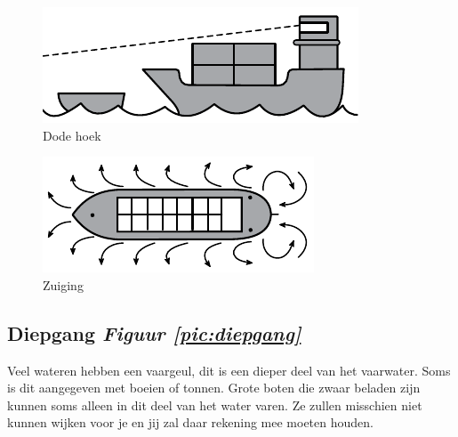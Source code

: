   \begin{center}
  \begin{minipage}[b]{0.32\textwidth}
    \begin{figure}[H]
 		\includegraphics[width=\textwidth]{Hoofdstukken/Veiligheid/pdf/dode_hoek.pdf}
        \caption{Dode hoek}
        \label{pic:dodehoek}
    \end{figure}
  \end{minipage}
    \hspace{2cm}
  \begin{minipage}[b]{0.32\textwidth}
  \begin{figure}[H]
 		\includegraphics[width=\textwidth]{Hoofdstukken/Veiligheid/pdf/zuiging.pdf}
        \caption{Zuiging}
        \label{pic:zuiging}
    \end{figure}
  \end{minipage}
  \end{center}


\subsection{Diepgang  \hfill \textit{Figuur \ref{pic:diepgang}}}
Veel wateren hebben een vaargeul, dit is een dieper deel van het vaarwater. Soms is dit aangegeven met boeien of tonnen. Grote boten die zwaar beladen zijn kunnen soms alleen in dit deel van het water varen. Ze zullen misschien niet kunnen wijken voor je en jij zal daar rekening mee moeten houden.

